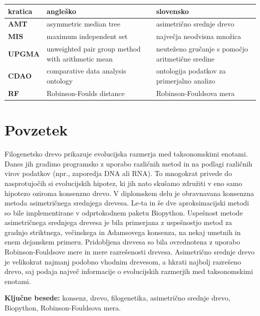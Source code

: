 \documentclass[a4paper, 12pt]{book}
\newcommand{\tkeywords}{konsenz, drevo, filogenetika, asimetrično srednje drevo, Biopython, Robinson-Fouldsova mera}
\newcommand{\clearemptydoublepage}{\newpage{\pagestyle{empty}\cleardoublepage}}
\begin{document}
\begin{tabular}{l|p{6cm}|p{6cm}}
  {\bf kratica} & {\bf angleško} & {\bf slovensko} \\ \hline
  {\bf AMT} & asymmetric median tree & asimetrično srednje drevo \\
  {\bf MIS} & maximum independent set & največja neodvisna množica \\
  {\bf UPGMA} & unweighted pair group method with arithmetic mean & neuteženo gručanje s pomočjo aritmetične sredine \\
  {\bf CDAO} & comparative data analysis ontology  & ontologija podatkov za primerjalno analizo \\
  {\bf RF} & Robinson-Foulds distance & Robinson-Fouldsova mera \\
\end{tabular}



\clearemptydoublepage

\chapter*{Povzetek}

Filogenetsko drevo prikazuje evolucijska razmerja med taksonomskimi
enotami. Danes jih gradimo programsko z uporabo različnih
metod in na podlagi različnih virov podatkov (npr., zaporedja DNA ali RNA).
To mnogokrat privede do nasprotujočih si evolucijskih hipotez, ki jih nato
skušamo združiti v eno samo hipotezo oziroma konsenzno drevo. V diplomskem
delu je obravnavana konsenzna metoda asimetričnega srednjega drevesa. Le-ta in
še dve aproksimacijski metodi so bile implementirane v odprtokodnem paketu
Biopython. Uspešnost metode asimetričnega srednjega drevesa je bila primerjana
z uspešnostjo metod za gradnjo striktnega, večinskega in Adamsovega
konsenza, na nekaj umetnih in enem dejanskem primeru. Pridobljena drevesa
so bila ovrednotena z uporabo Robinson-Fouldsove mere in mere razrešenosti
drevesa. Asimetrično srednje drevo je velikokrat najmanj podobno vhodnim
drevesom, a hkrati najbolj razrešeno drevo, saj podaja največ informacije o
evolucijskih razmerjih med taksonomskimi enotami.

\bigskip

\noindent\textbf{Ključne besede:} \tkeywords.
\clearemptydoublepage
\end{document}
